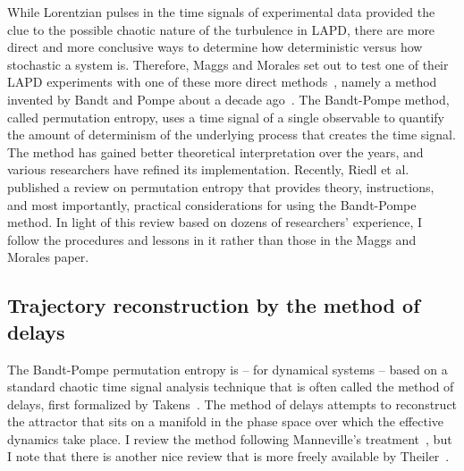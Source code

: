While Lorentzian pulses in the time signals of experimental data provided the clue to the possible chaotic nature of the turbulence in LAPD, there are more direct and more conclusive ways
to determine how deterministic versus how stochastic a system is. Therefore, Maggs and Morales set out to test one of their LAPD experiments with one of these more direct methods~\cite{maggs2013},
namely a method invented by Bandt and Pompe about a decade ago~\cite{bandt2002}. The Bandt-Pompe method, called permutation entropy, uses a
time signal of a single observable to quantify the amount of determinism of the underlying process that creates the time signal. The method has gained better theoretical
interpretation over the years, and various researchers have refined its implementation. Recently, Riedl et al.~\cite{riedle2013} published a review on permutation entropy that provides theory,
instructions, and most importantly, practical considerations for using the Bandt-Pompe method. In light of this review based on dozens of researchers' experience, I follow the procedures and lessons
in it rather than those in the Maggs and Morales paper.

\subsection{Trajectory reconstruction by the method of delays}
\label{ss_delays}

The Bandt-Pompe permutation entropy is -- for dynamical systems -- based on a standard chaotic time signal analysis technique that is often called the method of delays, 
first formalized by Takens~\cite{takens1981}. The method of delays attempts to reconstruct the attractor that sits on a manifold in the phase space over which the effective dynamics
take place. I review the method following Manneville's treatment~\cite{manneville2004}, but I note that there is another nice review that is more freely available by Theiler~\cite{theiler1990}.

